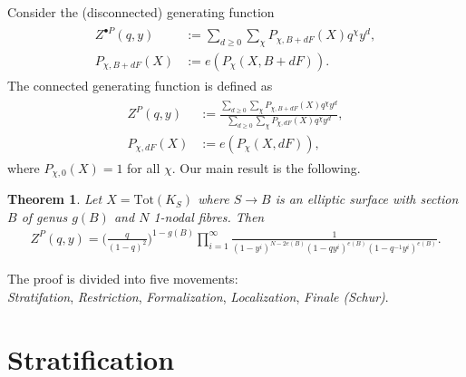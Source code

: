 \documentclass[12pt]{amsart}
\newtheorem{theorem}{Theorem}[section]
\theoremstyle{definition}
\theoremstyle{property}
\newcommand\mdot{{\scriptscriptstyle\bullet}}
\renewcommand\_{^{}_}
\begin{document}
Consider the (disconnected) generating function
\begin{align}
\begin{split} \label{discon}
Z^{\mdot P}(q,y) &:= \sum_{d \geq 0} \sum_{\chi} P_{\chi, B+dF}(X) q^{\chi} y^d, \\
P_{\chi, B+dF}(X) &:= e(P_{\chi}(X,B+dF)).
\end{split}
\end{align}
The connected generating function is defined as \cite{PT1}
\begin{align}
\begin{split} \label{con}
Z^{P}(q,y) &:= \frac{\sum_{d \geq 0} \sum_{\chi} P_{\chi,B+dF}(X) q^{\chi} y^d}{\sum_{d \geq 0} \sum_{\chi} P_{\chi,dF}(X) q^{\chi} y^d}, \\
P_{\chi,dF}(X) &:= e(P_{\chi}(X,dF)),
\end{split}
\end{align}
where $P_{\chi,0}(X) = 1$ for all $\chi$. Our main result is the following.
\begin{theorem} \label{mainthm}
Let $X = \mathrm{Tot}(K_S)$ where $S \rightarrow B$ is an elliptic surface with section $B$ of genus $g(B)$ and $N$ 1-nodal fibres. Then
\begin{align*}
Z^{P}(q,y) = \bigg( \frac{q}{(1-q)^2} \bigg)^{1-g(B)} \prod_{i=1}^{\infty} \frac{1}{(1-y^i)^{N - 2e(B)} (1 - q y^i)^{e(B)} (1 - q^{-1} y^i)^{e(B)}}.
\end{align*}
\end{theorem}
The proof is divided into five movements: \\

\noindent \emph{Stratifation}, \emph{Restriction}, \emph{Formalization}, \emph{Localization}, \emph{Finale (Schur)}. \\




\section{Stratification}
\end{document}
